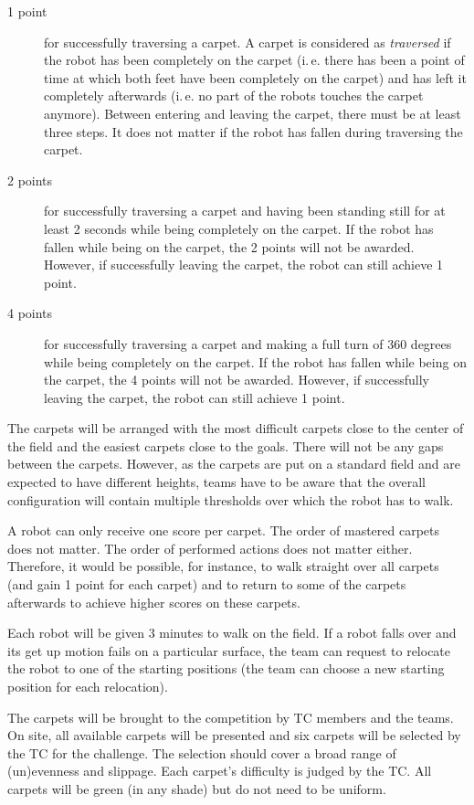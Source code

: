 \documentclass[12pt]{article}
\newcommand{\ie}{\mbox{i.\,e.}\xspace}
\begin{document}
\begin{description}
\item[1 point] for successfully traversing a carpet. A carpet is considered as \textit{traversed} if the robot has been completely on the carpet (\ie there has been a point of time at which both feet have been completely on the carpet) and has left it completely afterwards (\ie no part of the robots touches the carpet anymore). Between entering and leaving the carpet, there must be at least three steps. It does not matter if the robot has fallen during traversing the carpet.
\item[2 points] for successfully traversing a carpet and having been standing still for at least 2 seconds while being completely on the carpet. If the robot has fallen while being on the carpet, the 2 points will not be awarded. However, if successfully leaving the carpet, the robot can still achieve 1 point.
\item[4 points] for successfully traversing a carpet and making a full turn of 360 degrees while being completely on the carpet. If the robot has fallen while being on the carpet, the 4 points will not be awarded. However, if successfully leaving the carpet, the robot can still achieve 1 point.
\end{description}

The carpets will be arranged with the most difficult carpets close to the center of the field and the easiest carpets close to the goals. There will not be any gaps between the carpets. However, as the carpets are put on a standard field and are expected to have different heights, teams have to be aware that the overall configuration will contain multiple thresholds over which the robot has to walk.

A robot can only receive one score per carpet. The order of mastered carpets does not matter. The order of performed actions does not matter either. Therefore, it would be possible, for instance, to walk straight over all carpets (and gain 1 point for each carpet) and to return to some of the carpets afterwards to achieve higher scores on these carpets.

Each robot will be given 3 minutes to walk on the field. If a robot falls over and its get up motion fails on a particular surface, the team can request to relocate the robot to one of the starting positions (the team can choose a new starting position for each relocation).

The carpets will be brought to the competition by TC members and the teams. On site, all available carpets will be presented and six carpets will be selected by the TC for the challenge. The selection should cover a broad range of (un)evenness and slippage. Each carpet's difficulty is judged by the TC. All carpets will be green (in any shade) but do not need to be uniform.
\end{document}
